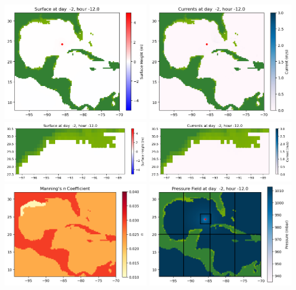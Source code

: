 \documentclass[11pt]{article}
\begin{document}
\vskip 10pt 
\includegraphics[width=0.475\textwidth]{frame0002fig1001.png}
\includegraphics[width=0.475\textwidth]{frame0002fig1002.png}
\vskip 10pt 
\includegraphics[width=0.475\textwidth]{frame0002fig1003.png}
\includegraphics[width=0.475\textwidth]{frame0002fig1004.png}
\vskip 10pt 
\includegraphics[width=0.475\textwidth]{frame0002fig1005.png}
\includegraphics[width=0.475\textwidth]{frame0002fig1006.png}
\end{document}
